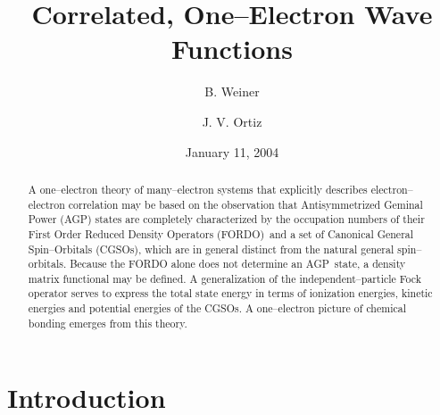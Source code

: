 \documentclass[aps,preprint]{revtex4}%
\begin{document}
\preprint{ }
\title{Correlated, One--Electron Wave Functions}
\author{B. Weiner}
\author{J. V. Ortiz}

\pacs{}

\begin{abstract}
A one--electron theory of many--electron systems that explicitly describes
electron--electron correlation may be based on the observation that
Antisymmetrized Geminal Power (AGP) states are completely characterized by the
occupation numbers of their First Order Reduced Density Operators (FORDO)\ and
a set of Canonical General Spin--Orbitals (CGSOs), which are in general
distinct from the natural general spin--orbitals. Because the FORDO alone does
not determine an AGP\ state, a density matrix functional may be defined. A
generalization of the independent--particle Fock operator serves to express
the total state energy in terms of ionization energies, kinetic energies and
potential energies of the CGSOs. A one--electron picture of chemical bonding
emerges from this theory.

\end{abstract}
\date{January 11, 2004}
\maketitle




\section{Introduction \label{intro}}
\end{document}

